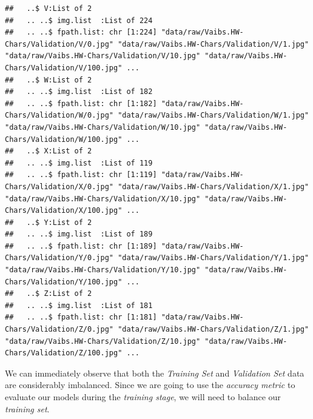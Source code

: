 \documentclass[
]{report}
\begin{document}
\begin{verbatim}
##   ..$ V:List of 2
##   .. ..$ img.list  :List of 224
##   .. ..$ fpath.list: chr [1:224] "data/raw/Vaibs.HW-Chars/Validation/V/0.jpg" "data/raw/Vaibs.HW-Chars/Validation/V/1.jpg" "data/raw/Vaibs.HW-Chars/Validation/V/10.jpg" "data/raw/Vaibs.HW-Chars/Validation/V/100.jpg" ...
##   ..$ W:List of 2
##   .. ..$ img.list  :List of 182
##   .. ..$ fpath.list: chr [1:182] "data/raw/Vaibs.HW-Chars/Validation/W/0.jpg" "data/raw/Vaibs.HW-Chars/Validation/W/1.jpg" "data/raw/Vaibs.HW-Chars/Validation/W/10.jpg" "data/raw/Vaibs.HW-Chars/Validation/W/100.jpg" ...
##   ..$ X:List of 2
##   .. ..$ img.list  :List of 119
##   .. ..$ fpath.list: chr [1:119] "data/raw/Vaibs.HW-Chars/Validation/X/0.jpg" "data/raw/Vaibs.HW-Chars/Validation/X/1.jpg" "data/raw/Vaibs.HW-Chars/Validation/X/10.jpg" "data/raw/Vaibs.HW-Chars/Validation/X/100.jpg" ...
##   ..$ Y:List of 2
##   .. ..$ img.list  :List of 189
##   .. ..$ fpath.list: chr [1:189] "data/raw/Vaibs.HW-Chars/Validation/Y/0.jpg" "data/raw/Vaibs.HW-Chars/Validation/Y/1.jpg" "data/raw/Vaibs.HW-Chars/Validation/Y/10.jpg" "data/raw/Vaibs.HW-Chars/Validation/Y/100.jpg" ...
##   ..$ Z:List of 2
##   .. ..$ img.list  :List of 181
##   .. ..$ fpath.list: chr [1:181] "data/raw/Vaibs.HW-Chars/Validation/Z/0.jpg" "data/raw/Vaibs.HW-Chars/Validation/Z/1.jpg" "data/raw/Vaibs.HW-Chars/Validation/Z/10.jpg" "data/raw/Vaibs.HW-Chars/Validation/Z/100.jpg" ...
\end{verbatim}

\normalsize

\newpage

We can immediately observe that both the \emph{Training Set} and \emph{Validation Set} data are considerably imbalanced. Since we are going to use the \emph{accuracy metric} to evaluate our models during the \emph{training stage}, we will need to balance our \emph{training set}.
\end{document}
